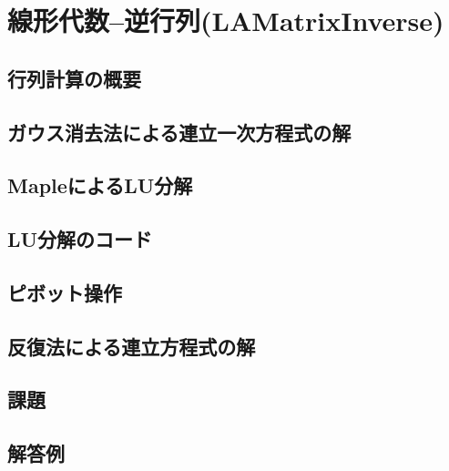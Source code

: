 \documentclass[10pt,a4j]{jreport}
\begin{document}
\chapter{線形代数--逆行列(LAMatrixInverse)}
\section{行列計算の概要}

\section{ガウス消去法による連立一次方程式の解}

\section{MapleによるLU分解}

\section{LU分解のコード}

\section{ピボット操作}

\section{反復法による連立方程式の解}

\section{課題}

\section{解答例}

\end{document}
